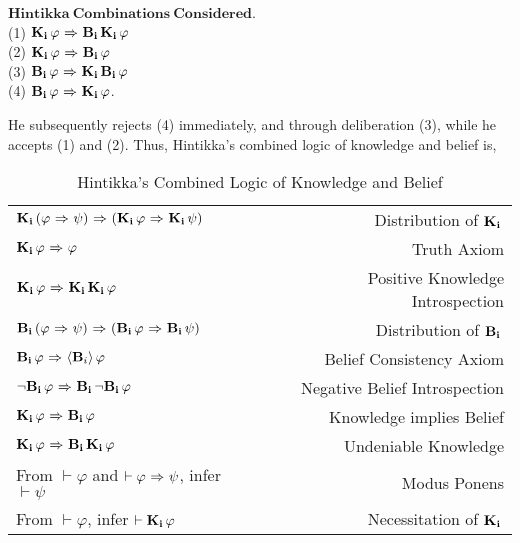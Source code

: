 $\mathbf{Hintikka\ Combinations\ Considered}$.\\
(1) $\Kns{i}\varphi \iimplies \Bels{i}\Kns{i}\varphi$\\
(2) $\Kns{i}\varphi \iimplies \Bels{i}\varphi$\\
(3) $\Bels{i}\varphi \iimplies \Kns{i}\Bels{i}\varphi$\\
(4) $\Bels{i}\varphi \iimplies \Kns{i}\varphi$.

He subsequently rejects (4) immediately, and through deliberation (3), while he accepts (1) and (2). Thus, Hintikka's combined logic of knowledge and belief is,

\begin{table}[H]
	\begin{center}
		\begin{tabular}{| l r |}
			\hline
			$\Kns{i}(\varphi \iimplies \psi) \iimplies (\Kns{i}\varphi \iimplies \Kns{i}\psi)$ & Distribution of $\Kns{i}$ \\
			$\Kns{i}\varphi \iimplies \varphi$ & Truth Axiom \\
			$\Kns{i}\varphi \iimplies \Kns{i}\Kns{i}\varphi$ & Positive Knowledge Introspection\\
			$\Bels{i}(\varphi \iimplies \psi) \iimplies (\Bels{i}\varphi \iimplies \Bels{i}\psi)$ & Distribution of $\Bels{i}$\\
			$\Bels{i}\varphi \iimplies \BPoss{i}\varphi$ & Belief Consistency Axiom\\
			$\tlnot\Bels{i}\varphi \iimplies \Bels{i}\tlnot\Bels{i}\varphi$ & Negative Belief Introspection\\
			$\Kns{i}\varphi \iimplies \Bels{i}\varphi$ & Knowledge implies Belief \\
			$\Kns{i}\varphi \iimplies \Bels{i}\Kns{i}\varphi$ & Undeniable Knowledge\\
			From $\vdash \varphi$ and $\vdash \varphi \iimplies \psi$, infer $\vdash\psi$ & Modus Ponens\\
			From $\vdash \varphi$, infer $\vdash \Kns{i}\varphi$ & Necessitation of $\Kns{i}$\\
			\hline
		\end{tabular}
		\caption{Hintikka's Combined Logic of Knowledge and Belief}
	\end{center}
\end{table}

